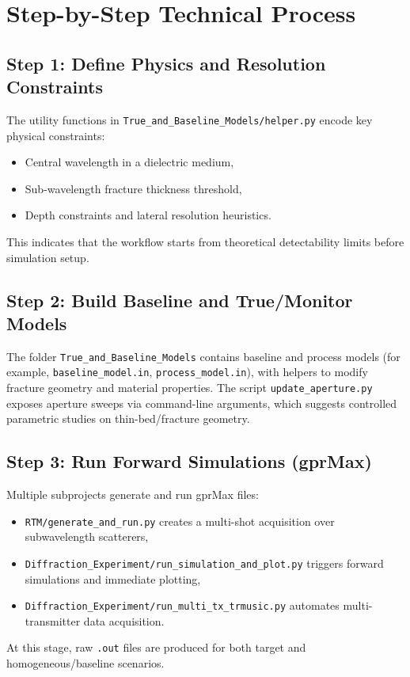 \documentclass[11pt,a4paper]{article}
\newcommand{\repo}[1]{\texttt{#1}}
\begin{document}
\section{Step-by-Step Technical Process}

\subsection*{Step 1: Define Physics and Resolution Constraints}
The utility functions in \repo{True\_and\_Baseline\_Models/helper.py} encode key physical constraints:
\begin{itemize}
    \item Central wavelength in a dielectric medium,
    \item Sub-wavelength fracture thickness threshold,
    \item Depth constraints and lateral resolution heuristics.
\end{itemize}
This indicates that the workflow starts from theoretical detectability limits before simulation setup.

\subsection*{Step 2: Build Baseline and True/Monitor Models}
The folder \repo{True\_and\_Baseline\_Models} contains baseline and process models (for example, \repo{baseline\_model.in}, \repo{process\_model.in}), with helpers to modify fracture geometry and material properties.
The script \repo{update\_aperture.py} exposes aperture sweeps via command-line arguments, which suggests controlled parametric studies on thin-bed/fracture geometry.

\subsection*{Step 3: Run Forward Simulations (gprMax)}
Multiple subprojects generate and run gprMax files:
\begin{itemize}
    \item \repo{RTM/generate\_and\_run.py} creates a multi-shot acquisition over subwavelength scatterers,
    \item \repo{Diffraction\_Experiment/run\_simulation\_and\_plot.py} triggers forward simulations and immediate plotting,
    \item \repo{Diffraction\_Experiment/run\_multi\_tx\_trmusic.py} automates multi-transmitter data acquisition.
\end{itemize}
At this stage, raw \repo{.out} files are produced for both target and homogeneous/baseline scenarios.
\end{document}
